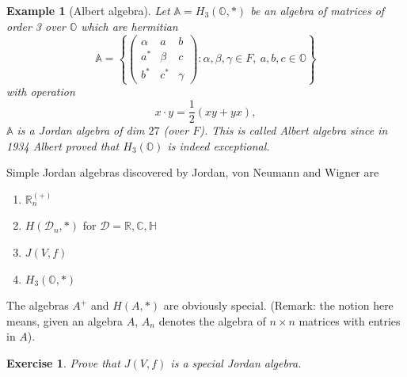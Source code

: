 \documentclass{article}
\newtheorem{example}[theorem]{Example}
\newtheorem{exercise}[theorem]{Exercise}
\begin{document}
\begin{example}[Albert algebra]

Let $\mathbb{A} = H_3(\mathbb{O}, *)$ be an algebra of matrices of order 3 over $\mathbb{O}$ which are hermitian
\[
\mathbb{A} = \left\{ \begin{pmatrix} \alpha & a & b \\ a^* & \beta & c \\ b^* & c^* & \gamma \end{pmatrix} : \alpha, \beta, \gamma \in F, \ a,b,c \in \mathbb{O} \right\}
\]
with operation
\[
x \cdot y = \frac{1}{2}(xy+yx),
\]
$\mathbb{A}$ is a Jordan algebra of dim $27$ (over $F$). This is called Albert algebra since in 1934 Albert proved that $ H_3(\mathbb{O}) $ is indeed exceptional. 

\end{example}

Simple Jordan algebras discovered by Jordan, von Neumann and Wigner are
\begin{enumerate}
    \item $\mathbb{R}_n^{(+)}$
    \item $H(\mathcal{D}_n,*)$ for $\mathcal{D} = \mathbb{R}, \mathbb{C}, \mathbb{H}$
    \item $J(V,f)$
    \item $H_3(\mathbb{O},*)$ 
\end{enumerate}

The algebras $A^+$ and $H(A,*)$ are obviously special. (Remark: the notion here means, given an algebra $ A $, $ A_n $ denotes the algebra of $ n \times n $ matrices with entries in $ A $).

\begin{exercise}
Prove that $ J(V, f) $ is a special Jordan algebra.
\end{exercise}
\end{document}
